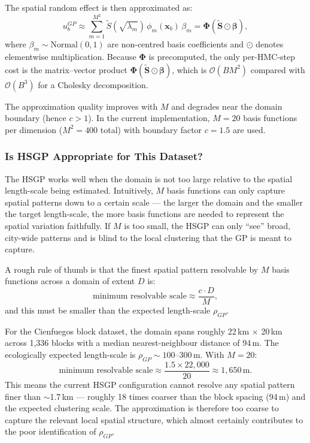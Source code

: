 \documentclass[12pt,a4paper]{article}
\begin{document}
The spatial random effect is then approximated as:
\begin{equation}
  u_b^{GP} \approx \sum_{m=1}^{M^2} \widetilde{S}(\sqrt{\lambda_m})\,\phi_m(\mathbf{x}_b)\,\beta_m = \boldsymbol{\Phi}\left(\widetilde{\mathbf{S}} \odot \boldsymbol{\beta}\right),
\end{equation}
where $\beta_m \sim \text{Normal}(0,1)$ are non-centred basis coefficients and $\odot$ denotes elementwise multiplication. Because $\boldsymbol{\Phi}$ is precomputed, the only per-HMC-step cost is the matrix--vector product $\boldsymbol{\Phi}(\widetilde{\mathbf{S}} \odot \boldsymbol{\beta})$, which is $\mathcal{O}(BM^2)$ compared with $\mathcal{O}(B^3)$ for a Cholesky decomposition.

The approximation quality improves with $M$ and degrades near the domain boundary (hence $c > 1$). In the current implementation, $M = 20$ basis functions per dimension ($M^2 = 400$ total) with boundary factor $c = 1.5$ are used.

\subsubsection{Is HSGP Appropriate for This Dataset?}

The HSGP works well when the domain is not too large relative to the spatial length-scale being estimated. Intuitively, $M$ basis functions can only capture spatial patterns down to a certain scale --- the larger the domain and the smaller the target length-scale, the more basis functions are needed to represent the spatial variation faithfully. If $M$ is too small, the HSGP can only ``see'' broad, city-wide patterns and is blind to the local clustering that the GP is meant to capture.

A rough rule of thumb is that the finest spatial pattern resolvable by $M$ basis functions across a domain of extent $D$ is:
\begin{equation}
  \text{minimum resolvable scale} \approx \frac{c \cdot D}{M},
\end{equation}
and this must be smaller than the expected length-scale $\rho_{GP}$.

For the Cienfuegos block dataset, the domain spans roughly 22\,km $\times$ 20\,km across 1{,}336 blocks with a median nearest-neighbour distance of 94\,m. The ecologically expected length-scale is $\rho_{GP} \sim 100$--$300$\,m. With $M = 20$:
\begin{equation}
  \text{minimum resolvable scale} \approx \frac{1.5 \times 22{,}000}{20} \approx 1{,}650\,\text{m}.
\end{equation}
This means the current HSGP configuration cannot resolve any spatial pattern finer than $\sim$1.7\,km --- roughly 18 times coarser than the block spacing (94\,m) and the expected clustering scale. The approximation is therefore too coarse to capture the relevant local spatial structure, which almost certainly contributes to the poor identification of $\rho_{GP}$.
\end{document}
